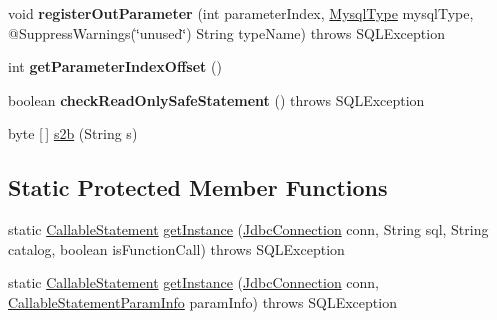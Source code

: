 \begin{DoxyCompactItemize}
void {\bfseries register\+Out\+Parameter} (int parameter\+Index, \mbox{\hyperlink{enumcom_1_1mysql_1_1cj_1_1_mysql_type}{Mysql\+Type}} mysql\+Type, @Suppress\+Warnings(\char`\"{}unused\char`\"{}) String type\+Name)  throws S\+Q\+L\+Exception 
\item 
\mbox{\label{classcom_1_1mysql_1_1cj_1_1jdbc_1_1_callable_statement_a74bf521ae6b025c69dd8c2ab02a0d318}} 
int {\bfseries get\+Parameter\+Index\+Offset} ()
\item 
\mbox{\label{classcom_1_1mysql_1_1cj_1_1jdbc_1_1_callable_statement_a105cffb3cb721f8d1228988106427140}} 
boolean {\bfseries check\+Read\+Only\+Safe\+Statement} ()  throws S\+Q\+L\+Exception 
\item 
byte \mbox{[}$\,$\mbox{]} \mbox{\hyperlink{classcom_1_1mysql_1_1cj_1_1jdbc_1_1_callable_statement_a7d985ddf5b86f79d5133d106d26dce95}{s2b}} (String s)
\end{DoxyCompactItemize}
\subsection*{Static Protected Member Functions}
\begin{DoxyCompactItemize}
\item 
static \mbox{\hyperlink{classcom_1_1mysql_1_1cj_1_1jdbc_1_1_callable_statement}{Callable\+Statement}} \mbox{\hyperlink{classcom_1_1mysql_1_1cj_1_1jdbc_1_1_callable_statement_a1226691f1ed6861ed209ec30c4cabb6d}{get\+Instance}} (\mbox{\hyperlink{interfacecom_1_1mysql_1_1cj_1_1jdbc_1_1_jdbc_connection}{Jdbc\+Connection}} conn, String sql, String catalog, boolean is\+Function\+Call)  throws S\+Q\+L\+Exception 
\item 
static \mbox{\hyperlink{classcom_1_1mysql_1_1cj_1_1jdbc_1_1_callable_statement}{Callable\+Statement}} \mbox{\hyperlink{classcom_1_1mysql_1_1cj_1_1jdbc_1_1_callable_statement_a0b4b36b3823d177a749e09a4a32971a9}{get\+Instance}} (\mbox{\hyperlink{interfacecom_1_1mysql_1_1cj_1_1jdbc_1_1_jdbc_connection}{Jdbc\+Connection}} conn, \mbox{\hyperlink{classcom_1_1mysql_1_1cj_1_1jdbc_1_1_callable_statement_1_1_callable_statement_param_info}{Callable\+Statement\+Param\+Info}} param\+Info)  throws S\+Q\+L\+Exception 
\end{DoxyCompactItemize}

